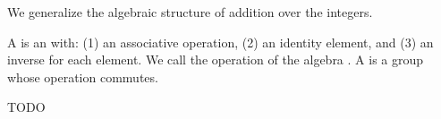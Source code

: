 
\sbasic






















\sstart
{}


We generalize the algebraic structure of
addition over the integers.


A  is an
 with:
(1) an associative operation,
(2) an identity element, and
(3) an inverse for each element.
We call the operation of the algebra
.
A 
is a group whose operation commutes.


TODO

\strats
